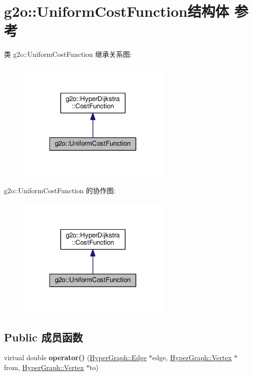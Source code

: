 \hypertarget{structg2o_1_1UniformCostFunction}{\section{g2o\-:\-:Uniform\-Cost\-Function结构体 参考}
\label{structg2o_1_1UniformCostFunction}
}


类 g2o\-:\-:Uniform\-Cost\-Function 继承关系图\-:
\nopagebreak
\begin{figure}[H]
\begin{center}
\leavevmode
\includegraphics[width=210pt]{structg2o_1_1UniformCostFunction__inherit__graph}
\end{center}
\end{figure}


g2o\-:\-:Uniform\-Cost\-Function 的协作图\-:
\nopagebreak
\begin{figure}[H]
\begin{center}
\leavevmode
\includegraphics[width=210pt]{structg2o_1_1UniformCostFunction__coll__graph}
\end{center}
\end{figure}
\subsection*{Public 成员函数}
\begin{DoxyCompactItemize}
\item 
\hypertarget{structg2o_1_1UniformCostFunction_a44e15e4af4310890d4c7965cb6c7aaad}{virtual double {\bfseries operator()} (\hyperlink{classg2o_1_1HyperGraph_1_1Edge}{Hyper\-Graph\-::\-Edge} $\ast$edge, \hyperlink{classg2o_1_1HyperGraph_1_1Vertex}{Hyper\-Graph\-::\-Vertex} $\ast$from, \hyperlink{classg2o_1_1HyperGraph_1_1Vertex}{Hyper\-Graph\-::\-Vertex} $\ast$to)}\label{structg2o_1_1UniformCostFunction_a44e15e4af4310890d4c7965cb6c7aaad}

\end{DoxyCompactItemize}


